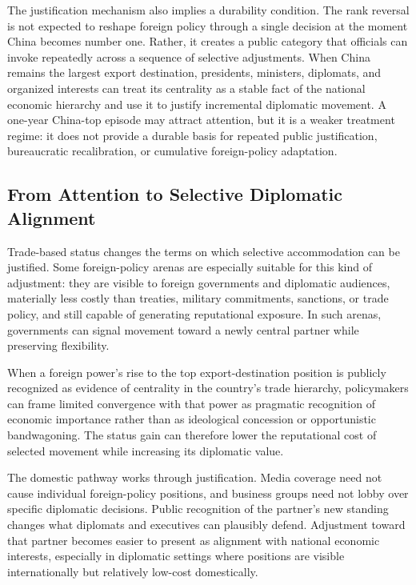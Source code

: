 \documentclass[
  12pt,
]{article}
\begin{document}
The justification mechanism also implies a durability condition. The rank reversal is not expected to reshape foreign policy through a single decision at the moment China becomes number one. Rather, it creates a public category that officials can invoke repeatedly across a sequence of selective adjustments. When China remains the largest export destination, presidents, ministers, diplomats, and organized interests can treat its centrality as a stable fact of the national economic hierarchy and use it to justify incremental diplomatic movement. A one-year China-top episode may attract attention, but it is a weaker treatment regime: it does not provide a durable basis for repeated public justification, bureaucratic recalibration, or cumulative foreign-policy adaptation.

\subsection{From Attention to Selective Diplomatic Alignment}\label{from-attention-to-selective-diplomatic-alignment}

Trade-based status changes the terms on which selective accommodation can be justified. Some foreign-policy arenas are especially suitable for this kind of adjustment: they are visible to foreign governments and diplomatic audiences, materially less costly than treaties, military commitments, sanctions, or trade policy, and still capable of generating reputational exposure. In such arenas, governments can signal movement toward a newly central partner while preserving flexibility.

When a foreign power's rise to the top export-destination position is publicly recognized as evidence of centrality in the country's trade hierarchy, policymakers can frame limited convergence with that power as pragmatic recognition of economic importance rather than as ideological concession or opportunistic bandwagoning. The status gain can therefore lower the reputational cost of selected movement while increasing its diplomatic value.

The domestic pathway works through justification. Media coverage need not cause individual foreign-policy positions, and business groups need not lobby over specific diplomatic decisions. Public recognition of the partner's new standing changes what diplomats and executives can plausibly defend. Adjustment toward that partner becomes easier to present as alignment with national economic interests, especially in diplomatic settings where positions are visible internationally but relatively low-cost domestically.
\end{document}

